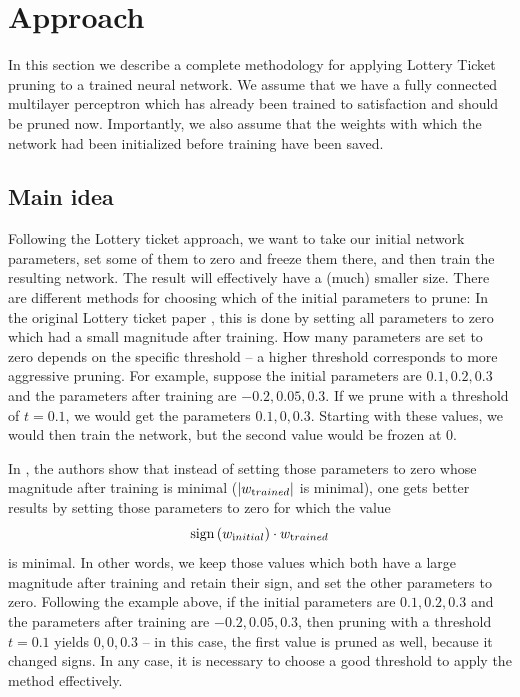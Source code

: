 \documentclass[12pt,final,twoside]{article}
\theoremstyle{plain}
\theoremstyle{definition}
\theoremstyle{remark}
\theoremstyle{named}
\begin{document}
\section{Approach}
In this section we describe a complete methodology for applying Lottery Ticket pruning to a trained neural network. We assume that we have a fully connected multilayer perceptron which has already been trained to satisfaction and should be pruned now. Importantly, we also assume that the weights with which the network had been initialized before training have been saved.

\subsection{Main idea}
Following the Lottery ticket approach, we want to take our initial network parameters, set some of them to zero and freeze them there, and then train the resulting network. The result will effectively have a (much) smaller size.
There are different methods for choosing which of the initial parameters to prune: In the original Lottery ticket paper \cite{lottery}, this is done by setting all parameters to zero which had a small magnitude after training. How many parameters are set to zero depends on the specific threshold -- a higher threshold corresponds to more aggressive pruning. For example, suppose the initial parameters are $0.1, 0.2, 0.3$ and the parameters after training are $-0.2, 0.05, 0.3$. If we prune with a threshold of $t = 0.1$, we would get the parameters $0.1, 0, 0.3$. Starting with these values, we would then train the network, but the second value would be frozen at $0$.

In \cite{supermask}, the authors show that instead of setting those parameters to zero whose magnitude after training is minimal ($|w_{\text trained}|$ is minimal), one gets better results by setting those parameters to zero for which the value 
$$
\operatorname{sign}\left(w_{\text initial}\right) \cdot w_{\text trained}
$$
is minimal. In other words, we keep those values which both have a large magnitude after training and retain their sign, and set the other parameters to zero. Following the example above, if the initial parameters are $0.1, 0.2, 0.3$ and the parameters after training are $-0.2, 0.05, 0.3$, then pruning with a threshold $t=0.1$ yields $0, 0, 0.3$ -- in this case, the first value is pruned as well, because it changed signs.
In any case, it is necessary to choose a good threshold to apply the method effectively.
\end{document}
